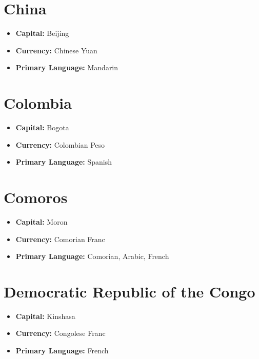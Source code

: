 \documentclass[a4paper,100pt,twoside]{book}
\begin{document}
\section*{\Huge China}
\vspace{5mm} %
\begin{itemize}
	\item \textbf{Capital:} Beijing
	\item \textbf{Currency:} Chinese Yuan
	\item \textbf{Primary Language:} Mandarin
\end{itemize}

\section*{\Huge Colombia}
\vspace{5mm} %
\begin{itemize}
	\item \textbf{Capital:} Bogota
	\item \textbf{Currency:} Colombian Peso
	\item \textbf{Primary Language:} Spanish
\end{itemize}

\section*{\Huge Comoros}
\vspace{5mm} %
\begin{itemize}
	\item \textbf{Capital:} Moron
	\item \textbf{Currency:} Comorian Franc
	\item \textbf{Primary Language:} Comorian, Arabic, French
\end{itemize}

\section*{\Huge Democratic Republic of the Congo}
\vspace{5mm} %
\begin{itemize}
	\item \textbf{Capital:} Kinshasa
	\item \textbf{Currency:} Congolese Franc
	\item \textbf{Primary Language:} French
\end{itemize}
\end{document}

